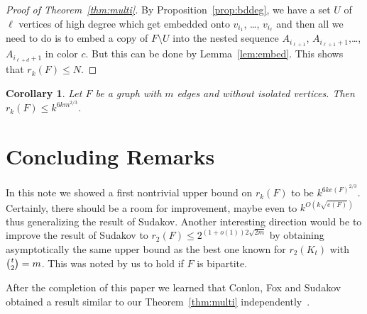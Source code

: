 \documentclass[reqno]{amsart}
\newtheorem{corollary}       [theorem] {Corollary}
\theoremstyle{remark}
\begin{document}
\begin{proof}[Proof of Theorem~\ref{thm:multi}]
By Proposition~\ref{prop:bddeg}, we have a set $U$ of  $\ell$ vertices of high degree 
which get embedded onto $v_{i_1}$, \ldots, $v_{i_\ell}$ and then all we 
need to do is to embed a copy of $F\setminus U$ into the nested sequence $A_{i_{\ell+1}}$, $A_{i_{\ell+1}+1}$,\ldots, $A_{i_{\ell+d}+1}$ 
in color $c$. But this can be done by Lemma~\ref{lem:embed}. This shows that $r_k(F)\le N$.
\end{proof}

\begin{corollary}
Let $F$ be a graph with $m$ edges and without isolated vertices. Then $r_k(F) \leq k^{6km^{2/3}}$.
\end{corollary}
 

\section{Concluding Remarks}
In this note we showed a first nontrivial upper bound on $r_k(F)$ to be $k^{6ke(F)^{2/3}}$. 
Certainly, there should be a room for improvement, maybe even to $k^{O(k \sqrt{e(F)})}$ thus generalizing the result of Sudakov. 
Another interesting direction would be to improve the result of Sudakov to $r_2(F)\le 2^{(1+o(1))2\sqrt{2m}}$ by obtaining  asymptotically 
the same upper bound as the best one known for $r_2(K_t)$ with $\tbinom{t}{2}=m$. This was noted by us to hold if $F$ is bipartite.
 
After the completion of this paper we learned that Conlon, Fox and Sudakov obtained 
a  result similar to our Theorem~\ref{thm:multi} independently~\cite{Sud13}.
\end{document}
